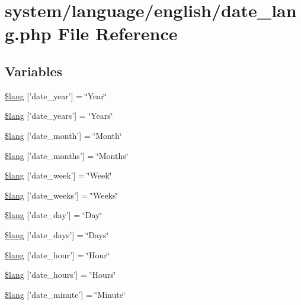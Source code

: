 \hypertarget{date__lang_8php}{\section{system/language/english/date\-\_\-lang.php File Reference}
\label{date__lang_8php}
}
\subsection*{Variables}
\begin{DoxyCompactItemize}
\item 
\hyperlink{date__lang_8php_ad344b819f5b881c0e2d75c994b8781b7}{\$lang} \mbox{[}'date\-\_\-year'\mbox{]} = \char`\"{}Year\char`\"{}
\item 
\hyperlink{date__lang_8php_ad553cabe66c6e6feff320f69fadfc561}{\$lang} \mbox{[}'date\-\_\-years'\mbox{]} = \char`\"{}Years\char`\"{}
\item 
\hyperlink{date__lang_8php_a27b6a453e0ff873f09050b0882b86b43}{\$lang} \mbox{[}'date\-\_\-month'\mbox{]} = \char`\"{}Month\char`\"{}
\item 
\hyperlink{date__lang_8php_af22d57f979004523c31e7252891b8ce1}{\$lang} \mbox{[}'date\-\_\-months'\mbox{]} = \char`\"{}Months\char`\"{}
\item 
\hyperlink{date__lang_8php_a027a67b9a8e626d4a9b4080f8100ca53}{\$lang} \mbox{[}'date\-\_\-week'\mbox{]} = \char`\"{}Week\char`\"{}
\item 
\hyperlink{date__lang_8php_af09796515b005d759204f911305a8459}{\$lang} \mbox{[}'date\-\_\-weeks'\mbox{]} = \char`\"{}Weeks\char`\"{}
\item 
\hyperlink{date__lang_8php_ab414526293ffead872f9b90ed4fdd552}{\$lang} \mbox{[}'date\-\_\-day'\mbox{]} = \char`\"{}Day\char`\"{}
\item 
\hyperlink{date__lang_8php_abb37886fce0ac3f342d17f4132740870}{\$lang} \mbox{[}'date\-\_\-days'\mbox{]} = \char`\"{}Days\char`\"{}
\item 
\hyperlink{date__lang_8php_a7a4e78ef1f19291c5a7818cf08bfa3ca}{\$lang} \mbox{[}'date\-\_\-hour'\mbox{]} = \char`\"{}Hour\char`\"{}
\item 
\hyperlink{date__lang_8php_ad1fe07226d651882b9ecce9cb2011db2}{\$lang} \mbox{[}'date\-\_\-hours'\mbox{]} = \char`\"{}Hours\char`\"{}
\item 
\hyperlink{date__lang_8php_a999a95f4f9c529af571d30f9615c93f3}{\$lang} \mbox{[}'date\-\_\-minute'\mbox{]} = \char`\"{}Minute\char`\"{}
\item 

\end{DoxyCompactItemize}
